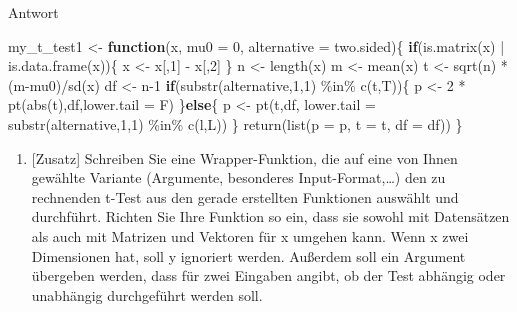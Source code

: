 \documentclass[
]{book}
\newenvironment{Shaded}{\begin{snugshade}}{\end{snugshade}}
\newcommand{\AttributeTok}[1]{\textcolor[rgb]{0.77,0.63,0.00}{#1}}
\newcommand{\ControlFlowTok}[1]{\textcolor[rgb]{0.13,0.29,0.53}{\textbf{#1}}}
\newcommand{\DecValTok}[1]{\textcolor[rgb]{0.00,0.00,0.81}{#1}}
\newcommand{\FunctionTok}[1]{\textcolor[rgb]{0.00,0.00,0.00}{#1}}
\newcommand{\NormalTok}[1]{#1}
\newcommand{\OtherTok}[1]{\textcolor[rgb]{0.56,0.35,0.01}{#1}}
\newcommand{\SpecialCharTok}[1]{\textcolor[rgb]{0.00,0.00,0.00}{#1}}
\newcommand{\StringTok}[1]{\textcolor[rgb]{0.31,0.60,0.02}{#1}}
\providecommand{\tightlist}{%
  \setlength{\itemsep}{0pt}\setlength{\parskip}{0pt}}
\begin{document}
Antwort

\begin{Shaded}
\begin{Highlighting}[]
\NormalTok{my\_t\_test1 }\OtherTok{\textless{}{-}} \ControlFlowTok{function}\NormalTok{(x, }\AttributeTok{mu0 =} \DecValTok{0}\NormalTok{, }\AttributeTok{alternative =} \StringTok{\textquotesingle{}two.sided\textquotesingle{}}\NormalTok{)\{ }
  \ControlFlowTok{if}\NormalTok{(}\FunctionTok{is.matrix}\NormalTok{(x) }\SpecialCharTok{|} \FunctionTok{is.data.frame}\NormalTok{(x))\{}
\NormalTok{    x }\OtherTok{\textless{}{-}}\NormalTok{ x[,}\DecValTok{1}\NormalTok{] }\SpecialCharTok{{-}}\NormalTok{ x[,}\DecValTok{2}\NormalTok{]}
\NormalTok{  \}}
\NormalTok{  n }\OtherTok{\textless{}{-}} \FunctionTok{length}\NormalTok{(x)}
\NormalTok{  m }\OtherTok{\textless{}{-}} \FunctionTok{mean}\NormalTok{(x)}
\NormalTok{  t }\OtherTok{\textless{}{-}} \FunctionTok{sqrt}\NormalTok{(n) }\SpecialCharTok{*}\NormalTok{ (m}\SpecialCharTok{{-}}\NormalTok{mu0)}\SpecialCharTok{/}\FunctionTok{sd}\NormalTok{(x)}
\NormalTok{  df }\OtherTok{\textless{}{-}}\NormalTok{ n}\DecValTok{{-}1}  
  \ControlFlowTok{if}\NormalTok{(}\FunctionTok{substr}\NormalTok{(alternative,}\DecValTok{1}\NormalTok{,}\DecValTok{1}\NormalTok{) }\SpecialCharTok{\%in\%} \FunctionTok{c}\NormalTok{(}\StringTok{\textquotesingle{}t\textquotesingle{}}\NormalTok{,}\StringTok{\textquotesingle{}T\textquotesingle{}}\NormalTok{))\{}
\NormalTok{    p }\OtherTok{\textless{}{-}} \DecValTok{2} \SpecialCharTok{*} \FunctionTok{pt}\NormalTok{(}\FunctionTok{abs}\NormalTok{(t),df,}\AttributeTok{lower.tail =}\NormalTok{ F)}
\NormalTok{  \}}\ControlFlowTok{else}\NormalTok{\{ }
\NormalTok{    p }\OtherTok{\textless{}{-}} \FunctionTok{pt}\NormalTok{(t,df,}
            \AttributeTok{lower.tail =} \FunctionTok{substr}\NormalTok{(alternative,}\DecValTok{1}\NormalTok{,}\DecValTok{1}\NormalTok{) }\SpecialCharTok{\%in\%} \FunctionTok{c}\NormalTok{(}\StringTok{\textquotesingle{}l\textquotesingle{}}\NormalTok{,}\StringTok{\textquotesingle{}L\textquotesingle{}}\NormalTok{))}
\NormalTok{  \}}
  \FunctionTok{return}\NormalTok{(}\FunctionTok{list}\NormalTok{(}\AttributeTok{p =}\NormalTok{ p,}
              \AttributeTok{t =}\NormalTok{ t,}
              \AttributeTok{df =}\NormalTok{ df))                }
\NormalTok{\}}
\end{Highlighting}
\end{Shaded}

\begin{enumerate}
\def\labelenumi{(\arabic{enumi})}
\setcounter{enumi}{6}
\tightlist
\item
  {[}Zusatz{]} Schreiben Sie eine Wrapper-Funktion, die auf eine von Ihnen gewählte Variante (Argumente, besonderes Input-Format,\ldots) den zu rechnenden t-Test aus den gerade erstellten Funktionen auswählt und durchführt. Richten Sie Ihre Funktion so ein, dass sie sowohl mit Datensätzen als auch mit Matrizen und Vektoren für x umgehen kann. Wenn x zwei Dimensionen hat, soll y ignoriert werden. Außerdem soll ein Argument übergeben werden, dass für zwei Eingaben angibt, ob der Test abhängig oder unabhängig durchgeführt werden soll.
\end{enumerate}
\end{document}
